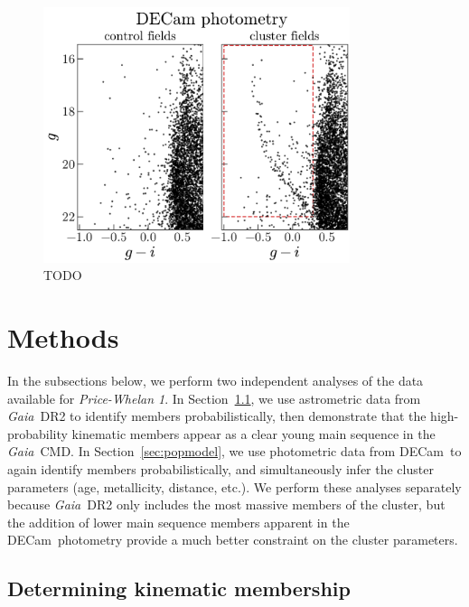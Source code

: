 \documentclass[modern]{aastex62}
\newcommand{\acronym}[1]{{\small{#1}}}
\newcommand{\gaia}{\textsl{Gaia}}
\newcommand{\decam}{DECam}
\newcommand{\DR}[1]{\acronym{DR#1}}
\newcommand{\sectionname}{Section}
\newcommand{\clustername}{\textsl{Price-Whelan 1}}
\begin{document}
\begin{figure}
\centering
\includegraphics[width=0.8\textwidth]{figures/DECam-cmd.pdf}
\caption{TODO}
\label{fig:decam-cmd}
\end{figure}


\section{Methods} \label{sec:methods}

In the subsections below, we perform two independent analyses of the data available for \clustername.
In \sectionname~\ref{sec:pmclean}, we use astrometric data from \gaia\ \DR{2} to identify members probabilistically, then demonstrate that the high-probability kinematic members appear as a clear young main sequence in the \gaia\ CMD.
In \sectionname~\ref{sec:popmodel}, we use photometric data from \decam\ to again identify members probabilistically, and simultaneously infer the cluster parameters (age, metallicity, distance, etc.).
We perform these analyses separately because \gaia\ \DR{2} only includes the most massive members of the cluster, but the addition of lower main sequence members apparent in the \decam\ photometry provide a much better constraint on the cluster parameters.


\subsection{Determining kinematic membership}
\label{sec:pmclean}
\end{document}
